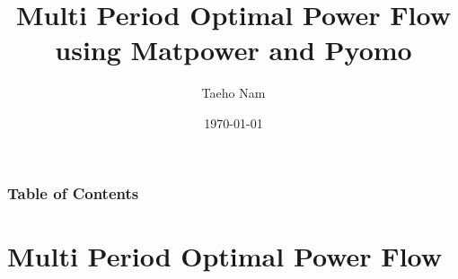 \documentclass[
	11pt, %
	aspectratio=169, %
]{beamer}
\title[OPF using Matpower and Pyomo]{Multi Period Optimal Power Flow \\ using Matpower and Pyomo} %
\author[Taeho Nam]{Taeho Nam} %
\institute[CWNU]{Changwon National University \\ \smallskip \textit{rapitransit@gmail.com}} %
\date[\today]{\today} %
\begin{document}

\begin{frame}
	\titlepage %
\end{frame}



\begin{frame}[allowframebreaks]
	\frametitle{Table of Contents} %
	
	\tableofcontents %
\end{frame}


\section{Multi Period Optimal Power Flow} %
\end{document}
